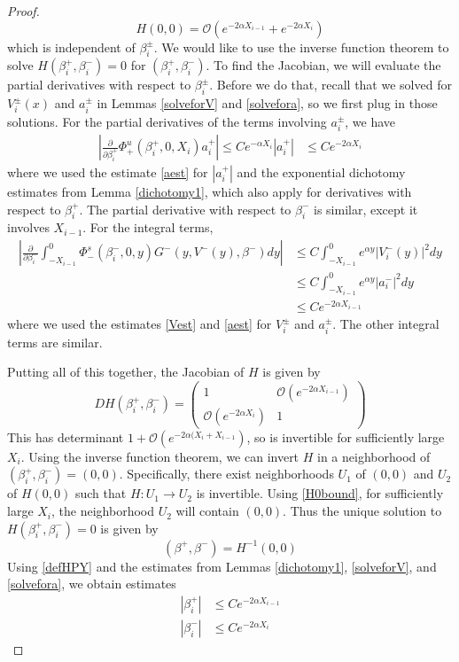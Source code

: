 \documentclass[thesis.tex]{subfiles}
\begin{document}
\begin{lemma}
\begin{proof}
\begin{equation}
H(0,0) = \mathcal{O}\left( e^{-2 \alpha X_{i-1}} + e^{-2 \alpha X_i}\right)
\end{equation}
which is independent of $\beta_i^\pm$. We would like to use the inverse function theorem to solve $H(\beta_i^+, \beta_i^-) = 0$ for $(\beta_i^+, \beta_i^-)$. To find the Jacobian, we will evaluate the partial derivatives with respect to $\beta_i^\pm$. Before we do that, recall that we solved for $V_i^\pm(x)$ and $a_i^\pm$ in Lemmas \ref{solveforV} and \ref{solvefora}, so we first plug in those solutions. For the partial derivatives of the terms involving $a_i^\pm$, we have
\begin{align*}
\left| \frac{\partial}{\partial \beta_i^+} \Phi^u_+(\beta_i^+, 0, X_i) a_i^+ \right| \leq C e^{-\alpha X_i}|a_i^+|
& \leq C e^{-2 \alpha X_i}
\end{align*}
where we used the estimate \eqref{aest} for $|a_i^+|$ and the exponential dichotomy estimates from Lemma \ref{dichotomy1}, which also apply for derivatives with respect to $\beta_i^+$. The partial derivative with respect to $\beta_i^-$ is similar, except it involves $X_{i-1}$. For the integral terms, 
\begin{align*}
\left| \frac{\partial}{\partial \beta_i^-} \int_{-X_{i-1}}^0 \Phi_-^s(\beta_i^-, 0, y) G^-(y, V^-(y),\beta^-)dy \right| 
&\leq C \int_{-X_{i-1}}^0 e^{\alpha y} | V_i^-(y) |^2 dy \\
&\leq C \int_{-X_{i-1}}^0 e^{\alpha y} | a_i^-|^2 dy \\
&\leq C e^{-2 \alpha X_{i-1}}
\end{align*}
where we used the estimates \eqref{Vest} and \eqref{aest} for $V_i^\pm$ and $a_i^\pm$. The other integral terms are similar.

Putting all of this together, the Jacobian of $H$ is given by
\begin{equation}
D H(\beta_i^+, \beta_i^-) = 
\begin{pmatrix}
1 & \mathcal{O}(e^{-2 \alpha X_{i-1}} ) \\
\mathcal{O}(e^{-2 \alpha X_i}) &  1 
\end{pmatrix}
\end{equation}
This has determinant $1 + \mathcal{O}(e^{-2\alpha (X_i+X_{i-1}})$, so is invertible for sufficiently large $X_i$. Using the inverse function theorem, we can invert $H$ in a neighborhood of $(\beta_i^+, \beta_i^-) = (0, 0)$. Specifically, there exist neighborhoods $U_1$ of $(0,0)$ and $U_2$ of $H(0,0)$ such that $H: U_1 \rightarrow U_2$ is invertible. Using \eqref{H0bound}, for sufficiently large $X_i$, the neighborhood $U_2$ will contain $(0,0)$. Thus the unique solution to $H(\beta_i^+, \beta_i^-) = 0$ is given by
\[
(\beta^+, \beta^-) = H^{-1}(0, 0)
\]
Using \eqref{defHPY} and the estimates from Lemmas \ref{dichotomy1}, \ref{solveforV}, and \ref{solvefora}, we obtain estimates
\begin{align*}
|\beta_i^+| &\leq C e^{-2 \alpha X_{i-1}} \\
|\beta_i^-| &\leq C e^{-2 \alpha X_i}
\end{align*}
\end{proof}
\end{lemma}
\end{document}
